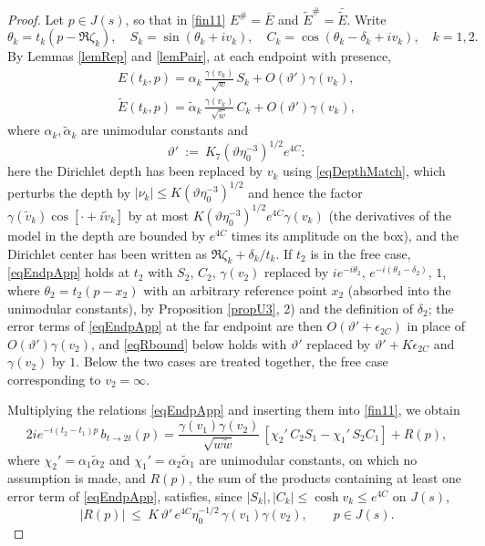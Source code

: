 \documentclass[11pt,twoside,reqno]{amsart}
\def\ti{\tilde}
\def\to{\rightarrow}
\def\d{\delta}
\def\g{\gamma}
\def\a{\alpha}
\theoremstyle{plain}
\numberwithin{equation}{section}
\begin{document}
\begin{proof}
Let $p\in J(s)$, so that in \eqref{fin11} $E^\#=\bar E$ and $\ti E^\#=\bar{\ti E}$. Write
$$\theta_k=t_k(p-\Re\zeta_k),\quad S_k=\sin(\theta_k+iv_k),\quad C_k=\cos(\theta_k-\d_k+iv_k),\quad k=1,2.$$
By Lemmas \ref{lemRep} and \ref{lemPair}, at each endpoint with presence,
\begin{equation}
\begin{gathered}
E(t_k,p)=\a_k\,\frac{\g(v_k)}{\sqrt{w}}\,S_k+O(\vartheta')\g(v_k),\\
\ti E(t_k,p)=\ti\a_k\,\frac{\g(v_k)}{\sqrt{\ti w}}\,C_k+O(\vartheta')\g(v_k),
\end{gathered}
\label{eqEndpApp}
\end{equation}
where $\a_k,\ti\a_k$ are unimodular constants and
$$\vartheta'\ :=\ K_7\left(\vartheta\eta_0^{-3}\right)^{1/2}e^{4C}:$$
here the Dirichlet depth has been replaced by $v_k$ using \eqref{eqDepthMatch}, which perturbs the depth by $|\nu_k|\leq K(\vartheta\eta_0^{-3})^{1/2}$ and hence the factor $\g(\ti v_k)\cos[\cdot+i\ti v_k]$ by at most $K(\vartheta\eta_0^{-3})^{1/2}e^{4C}\g(v_k)$ (the derivatives of the model in the depth are bounded by $e^{4C}$ times its amplitude on the box), and the Dirichlet center has been written as $\Re\zeta_k+\d_k/t_k$. If $t_2$ is in the free case, \eqref{eqEndpApp} holds at $t_2$ with $S_2$, $C_2$, $\g(v_2)$ replaced by $ie^{-i\theta_2}$, $e^{-i(\theta_2-\d_2)}$, $1$, where $\theta_2=t_2(p-x_2)$ with an arbitrary reference point $x_2$ (absorbed into the unimodular constants), by Proposition \ref{propU3}, 2) and the definition of $\d_2$; the error terms of \eqref{eqEndpApp} at the far endpoint are then $O\left(\vartheta'+\epsilon_{2C}\right)$ in place of $O(\vartheta')\g(v_2)$, and \eqref{eqRbound} below holds with $\vartheta'$ replaced by $\vartheta'+K\epsilon_{2C}$ and $\g(v_2)$ by $1$. Below the two cases are treated together, the free case corresponding to $v_2=\infty$.

Multiplying the relations \eqref{eqEndpApp} and inserting them into \eqref{fin11}, we obtain
\begin{equation}
2ie^{-i(t_2-t_1)p}\,b_{t\to2t}(p)=\frac{\g(v_1)\g(v_2)}{\sqrt{w\ti w}}\,
\left[\chi_2' \,C_2S_1-\chi_1'\, S_2C_1\right]+R(p),
\label{eqModelB}
\end{equation}
where $\chi_2'=\a_1\ti\a_2$ and $\chi_1'=\a_2\ti\a_1$ are unimodular constants, on which no assumption is made, and $R(p)$, the sum of the products containing at least one error term of \eqref{eqEndpApp}, satisfies, since $|S_k|,|C_k|\leq\cosh v_k\leq e^{4C}$ on $J(s)$,
\begin{equation}
|R(p)|\ \leq\ K\,\vartheta'\,e^{4C}\eta_0^{-1/2}\,\g(v_1)\g(v_2),\qquad p\in J(s).
\label{eqRbound}
\end{equation}


\end{proof}
\end{document}
